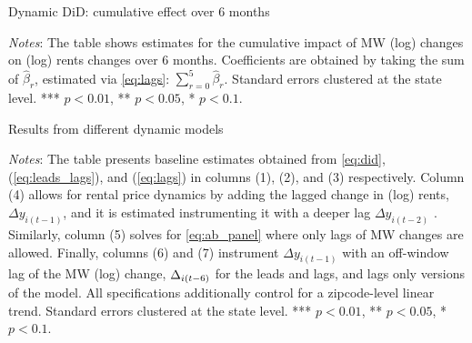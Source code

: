 
\begin{table}[h!]
	\caption{Dynamic DiD: cumulative effect over 6 months}
	\label{tab:dynamic_cumulative}
	\centering
	\resizebox{0.7\textwidth}{!}{
		\vspace{0pt}    
		
	}
	\begin{minipage}{.95\textwidth} \footnotesize
		\vspace{3mm} 
		\textit{Notes}: The table shows estimates for the cumulative impact of MW (log) changes 
		on (log) rents changes over 6 months. Coefficients are obtained by taking the sum of 
		$\hat{\beta}_{r}$, estimated via \autoref{eq:lags}: $\sum\limits_{r=0}^{5} \hat{\beta}_{r}$. 
		Standard errors clustered at the state level. *** $p < 0.01$, ** $p < 0.05$, * $p < 0.1$.   
	\end{minipage}
\end{table}

\clearpage
\begin{landscape}
	\begin{table}[h!]
	    \caption{Results from different dynamic models}
	    \label{tab:horse_race_main}
	    \centering
	    \resizebox{1.2\textwidth}{!}{
		    \vspace{0pt}    
		    
	    }
	    \begin{minipage}{1.15\textwidth} \footnotesize
			\vspace{3mm} 
			\textit{Notes}: The table presents baseline estimates obtained from \autoref{eq:did}, 
			(\ref{eq:leads_lags}), and (\ref{eq:lags}) in columns (1), (2), and (3) respectively. 
			Column (4) allows for rental price dynamics by adding the lagged change in (log) rents, 
			$\Delta y_{i(t-1)}$, and it is estimated instrumenting it with a deeper lag $\Delta 
			y_{i(t-2)}$ \parencite{arellano1991some}. Similarly, column (5) solves for 
			\autoref{eq:ab_panel} where only lags of MW changes are allowed. Finally, columns (6) and 
			(7) instrument $\Delta y_{i(t-1)}$ with an off-window lag of the MW (log) change, $\Delta 
			\title{MW}_{i(t-6)}$ for the leads and lags, and lags only versions of the model. All 
			specifications additionally control for a zipcode-level linear trend. Standard errors 
			clustered at the state level. *** $p < 0.01$, ** $p < 0.05$, * $p < 0.1$.   
		\end{minipage}
	\end{table}
\end{landscape}

